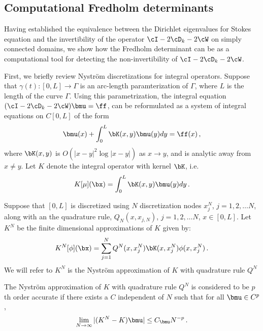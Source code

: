 \subsection{Computational Fredholm determinants}
Having established the equivalence between the Dirichlet eigenvalues
for Stokes equation and the invertibility of
the operator $\cI - 2\cD_{k} - 2\cW$ on simply connected domains, we show how 
the Fredholm determinant can be as a computational tool for detecting
the non-invertibility of $\cI - 2\cD_{k} - 2\cW$.

First, we briefly review Nystr\"{o}m discretizations for integral operators.
Suppose that $\gamma(t):[0,L] \to \Gamma$ is an arc-length
paramterization of $\Gamma$, where $L$ is the length of the
curve $\Gamma$.
Using this parametrization, the integral equation
$(\cI - 2\cD_{k} - 2\cW)\bmu = \ff$, 
can be reformulated as a system of integral equations on 
$C[0,L]$ of the form 
\begin{equation}
\bmu(x) + \int_{0}^{L} \bK(x,y) \bmu(y) dy = \ff(x) \, ,  \label{inteqfreddet}
\end{equation}
where $\bK(x,y)$ is $O(|x-y|^2 \log{|x-y|})$ as $x\to y$, and
is analytic away from $x\neq y$.
Let $K$ denote the integral operator with kernel $\bK$, i.e.
\begin{equation}
K[\mu](\bx) = \int_{0}^{L} \bK(x,y) \bmu(y) dy \, .
\end{equation}


Suppose that $[0,L]$ is discretized using $N$ discretization
nodes $x_{j}^{N}$, $j=1,2,\ldots N$, along with an
the quadrature rule, $Q_{N}(x,x_{j,N})$, $j=1,2,\ldots N$, $x\in[0,L]$.
Let $K^{N}$ be the finite dimensional approximations of $K$ 
given by:
\begin{equation}
K^{N}[\phi](\bx) = \sum_{j=1}^{N} Q^{N}(x,x^{N}_{j})  
\bK(x,x_{j}^{N}) \phi(x,x_{j}^{N}) \, .
\end{equation}
We will refer to $K^{N}$ is the Nystr\"{o}m approximation of $K$ 
with quadrature rule $Q^{N}$


\begin{definition}
The Nystr\"{o}m approximation of $K$ with quadrature rule $Q^{N}$ 
is considered to be $p$th order accurate 
if there exists a $C$ independent of $N$
such that for all $\bmu \in C^{p}$, 
\begin{equation}
\lim_{N\to \infty} |(K^{N} - K)\bmu| \leq C_{\bmu} N^{-p} \, .
\end{equation}
\end{definition}

